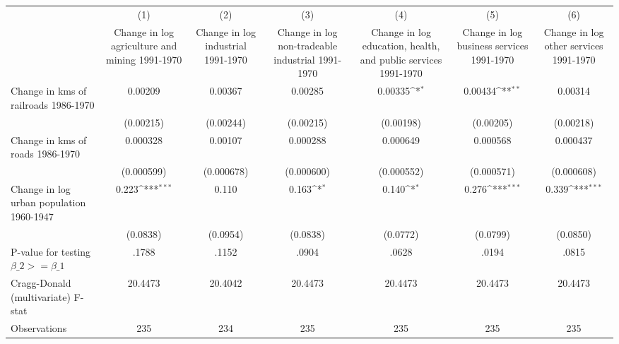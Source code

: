 {
\def\sym#1{\ifmmode^{#1}\else\(^{#1}\)\fi}
\begin{tabular}{l*{6}{c}}
\hline\hline
                &\multicolumn{1}{c}{(1)}&\multicolumn{1}{c}{(2)}&\multicolumn{1}{c}{(3)}&\multicolumn{1}{c}{(4)}&\multicolumn{1}{c}{(5)}&\multicolumn{1}{c}{(6)}\\
                &\multicolumn{1}{c}{Change in log agriculture and mining 1991-1970}&\multicolumn{1}{c}{Change in log industrial 1991-1970}&\multicolumn{1}{c}{Change in log non-tradeable industrial 1991-1970}&\multicolumn{1}{c}{Change in log education, health, and public services 1991-1970}&\multicolumn{1}{c}{Change in log business services 1991-1970}&\multicolumn{1}{c}{Change in log other services 1991-1970}\\
\hline
Change in kms of railroads 1986-1970&  0.00209         &  0.00367         &  0.00285         &  0.00335\sym{*}  &  0.00434\sym{**} &  0.00314         \\
                &(0.00215)         &(0.00244)         &(0.00215)         &(0.00198)         &(0.00205)         &(0.00218)         \\
[1em]
Change in kms of roads 1986-1970& 0.000328         &  0.00107         & 0.000288         & 0.000649         & 0.000568         & 0.000437         \\
                &(0.000599)         &(0.000678)         &(0.000600)         &(0.000552)         &(0.000571)         &(0.000608)         \\
[1em]
Change in log urban population 1960-1947&    0.223\sym{***}&    0.110         &    0.163\sym{*}  &    0.140\sym{*}  &    0.276\sym{***}&    0.339\sym{***}\\
                & (0.0838)         & (0.0954)         & (0.0838)         & (0.0772)         & (0.0799)         & (0.0850)         \\
\hline
P-value for testing $\beta\_{2} >= \beta\_{1}$&    .1788         &    .1152         &    .0904         &    .0628         &    .0194         &    .0815         \\
Cragg-Donald (multivariate) F-stat&  20.4473         &  20.4042         &  20.4473         &  20.4473         &  20.4473         &  20.4473         \\
Observations    &      235         &      234         &      235         &      235         &      235         &      235         \\
\hline\hline
\end{tabular}
}

